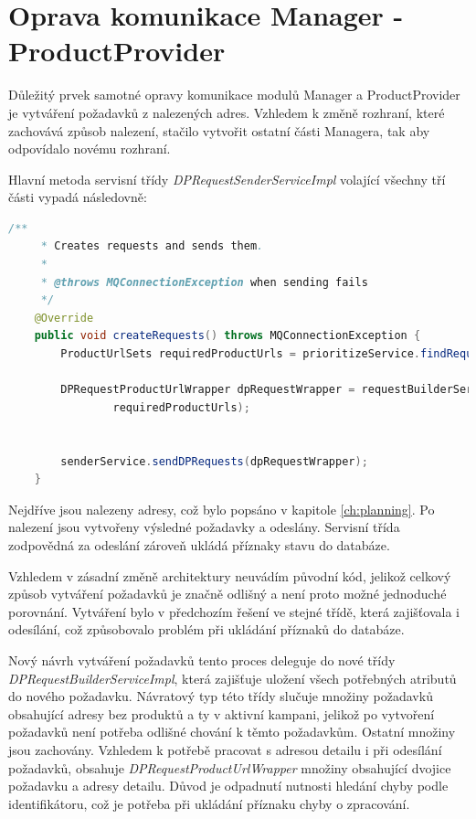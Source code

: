 \documentclass[thesis=B,czech]{FITthesis}[2012/06/26]
\begin{document}
\section{Oprava komunikace Manager - ProductProvider}
Důležitý prvek samotné opravy komunikace modulů Manager a ProductProvider je vytváření požadavků z nalezených adres.
Vzhledem k změně rozhraní, které zachovává způsob nalezení, stačilo vytvořit ostatní části Managera, tak aby odpovídalo novému rozhraní.
\par
Hlavní metoda servisní třídy \textit{DPRequestSenderServiceImpl} volající všechny tří části vypadá následovně:
\begin{lstlisting}[language=Java]
    /**
     * Creates requests and sends them.
     *
     * @throws MQConnectionException when sending fails
     */
    @Override
    public void createRequests() throws MQConnectionException {
        ProductUrlSets requiredProductUrls = prioritizeService.findRequiredProductUrls();

        DPRequestProductUrlWrapper dpRequestWrapper = requestBuilderService.create(
                requiredProductUrls);


        senderService.sendDPRequests(dpRequestWrapper);
    }
\end{lstlisting}
Nejdříve jsou nalezeny adresy, což bylo popsáno v kapitole \ref{ch:planning}. Po nalezení jsou vytvořeny výsledné požadavky
a odeslány. Servisní třída zodpovědná za odeslání zároveň ukládá příznaky stavu do databáze.
\par
Vzhledem v zásadní změně architektury neuvádím původní kód, jelikož celkový způsob vytváření požadavků je značně odlišný a není proto možné jednoduché porovnání. Vytváření bylo v předchozím řešení ve stejné třídě, která zajišťovala i odesílání, což způsobovalo problém při ukládání příznaků do databáze.
\par
Nový návrh vytváření požadavků tento proces deleguje do nové 
třídy  \\ \textit{DPRequestBuilderServiceImpl}, která zajišťuje uložení všech potřebných atributů do nového požadavku. Návratový typ této třídy slučuje množiny požadavků obsahující adresy bez produktů a 
ty v aktivní kampani, jelikož po vytvoření požadavků není potřeba odlišné chování k těmto požadavkům. Ostatní množiny jsou 
zachovány. Vzhledem k potřebě pracovat s adresou detailu i při odesílání požadavků, obsahuje \textit{DPRequestProductUrlWrapper}
množiny obsahující dvojice požadavku a adresy detailu. Důvod je odpadnutí nutnosti hledání chyby podle identifikátoru, což je potřeba
při ukládání příznaku chyby o zpracování.
\end{document}
